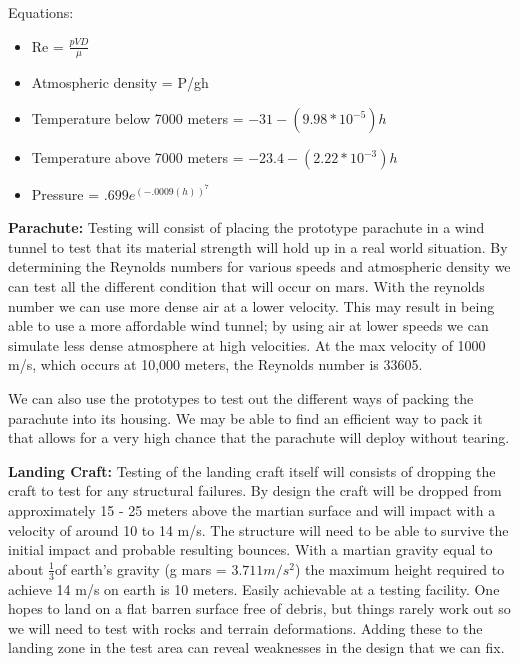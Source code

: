 \documentclass[%
 portrait,
 aapm,
 mph,%
 amsmath,amssymb,
 reprint,%
]{revtex4-2}
\begin{document}
Equations:
\begin{itemize}
    \item Re = \begin{math} \frac{pVD}{\mu} \end{math}
    \item Atmospheric density = P/gh
    \item Temperature below 7000 meters = \begin{math} -31 -(9.98*10^{-5})h \end{math}
    \item Temperature above 7000 meters = \begin{math} -23.4 -(2.22*10^{-3})h \end{math}
    \item Pressure = \begin{math} .699e^{(-.0009(h))^7} \end{math}
\end{itemize}

\textbf{Parachute: } Testing will consist of placing the prototype parachute in a wind tunnel to test that its material strength will hold up in a real world situation.  By determining the Reynolds numbers for various speeds and atmospheric density we can test all the different condition that will occur on mars.  With the reynolds number we can use more dense air at a lower velocity.  This may result in being able to use a more affordable wind tunnel; by using air at lower speeds we can simulate less dense atmosphere at high velocities.  At the max velocity of 1000 m/s, which occurs at 10,000 meters, the Reynolds number is 33605.

We can also use the prototypes to test out the different ways of packing the parachute into its housing.  We may be able to find an efficient way to pack it that allows for a very high chance that the parachute will deploy without tearing.

\textbf{Landing Craft: } Testing of the landing craft itself will consists of dropping the craft to test for any structural failures.  By design the craft will be dropped from approximately 15 - 25 meters above the martian surface and will impact with a velocity of around 10 to 14 m/s.  The structure will need to be able to survive the initial impact and probable resulting bounces.  With a martian gravity equal to about \begin{math} \frac{1}{3} \end{math}of earth's gravity (g mars = \begin{math}3.711 m/s^2\end{math}) the maximum height required to achieve 14 m/s on earth is 10 meters.  Easily achievable at a testing facility.  One hopes to land on a flat barren surface free of debris, but things rarely work out so we will need to test with rocks and terrain deformations.  Adding these to the landing zone in the test area can reveal weaknesses in the design that we can fix.
\end{document}
